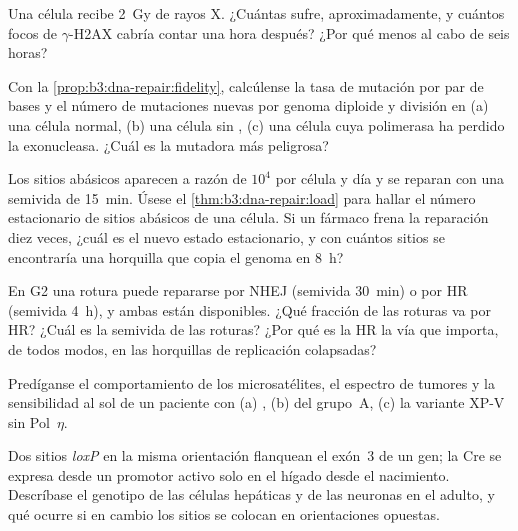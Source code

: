 \begin{exercise}[$\star$]\label{exo:b3:dna-repair:4}
Una célula recibe \qty{2}{Gy} de rayos X. ¿Cuántas 
sufre, aproximadamente, y cuántos focos de $\gamma$-H2AX cabría contar
una hora después? ¿Por qué menos al cabo de seis horas?
\end{exercise}

\begin{exercise}[$\star\star$]\label{exo:b3:dna-repair:5}
Con la \cref{prop:b3:dna-repair:fidelity}, calcúlense la tasa de mutación
por par de bases y el número de mutaciones nuevas por genoma diploide y
división en (a) una célula normal, (b) una célula sin , (c) una célula cuya polimerasa ha perdido la
exonucleasa. ¿Cuál es la mutadora más peligrosa?
\end{exercise}

\begin{exercise}[$\star\star$]\label{exo:b3:dna-repair:6}
Los sitios abásicos aparecen a razón de $10^{4}$ por célula y día y se
reparan con una semivida de \qty{15}{min}. Úsese el
\cref{thm:b3:dna-repair:load} para hallar el número estacionario de
sitios abásicos de una célula. Si un fármaco frena la reparación diez
veces, ¿cuál es el nuevo estado estacionario, y con cuántos sitios se
encontraría una horquilla que copia el genoma en \qty{8}{h}?
\end{exercise}

\begin{exercise}[$\star\star$]\label{exo:b3:dna-repair:7}
En G2 una rotura puede repararse por NHEJ (semivida \qty{30}{min}) o por
HR (semivida \qty{4}{h}), y ambas están disponibles. ¿Qué fracción de las
roturas va por HR? ¿Cuál es la semivida de las roturas? ¿Por qué es la HR
la vía que importa, de todos modos, en las horquillas de replicación
colapsadas?
\end{exercise}

\begin{exercise}[$\star\star$]\label{exo:b3:dna-repair:8}
Predíganse el comportamiento de los microsatélites, el espectro de
tumores y la sensibilidad al sol de un paciente con (a) , (b)  del grupo~A, (c) la variante XP-V sin
Pol~$\eta$.
\end{exercise}

\begin{exercise}[$\star\star$]\label{exo:b3:dna-repair:9}
Dos sitios \emph{loxP} en la misma orientación flanquean el exón~3 de un
gen; la Cre se expresa desde un promotor activo solo en el hígado desde
el nacimiento. Descríbase el genotipo de las células hepáticas y de las
neuronas en el adulto, y qué ocurre si en cambio los sitios se colocan en
orientaciones opuestas.
\end{exercise}

